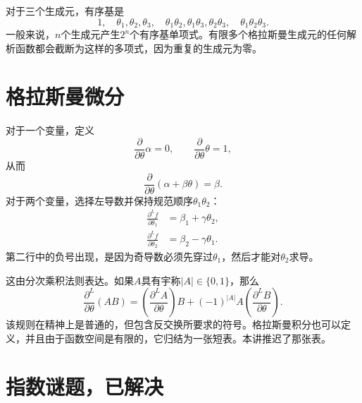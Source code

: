 \begin{classroomqa}
\end{classroomqa}

对于三个生成元，有序基是
\begin{equation}
1,\quad
\theta_1,\theta_2,\theta_3,\quad
\theta_1\theta_2,\theta_1\theta_3,\theta_2\theta_3,\quad
\theta_1\theta_2\theta_3.
\end{equation}
一般来说，\(n\)个生成元产生\(2^n\)个有序基单项式。有限多个格拉斯曼生成元的任何解析函数都会截断为这样的多项式，因为重复的生成元为零。

\section{格拉斯曼微分}

对于一个变量，定义
\begin{equation}
\frac{\partial}{\partial\theta}\alpha=0,
\qquad
\frac{\partial}{\partial\theta}\theta=1,
\end{equation}
从而
\begin{equation}
\frac{\partial}{\partial\theta}
(\alpha+\beta\theta)=\beta.
\end{equation}
对于两个变量，选择左导数并保持规范顺序\(\theta_1\theta_2\)：
\begin{align}
\frac{\partial^L f}{\partial\theta_1}
&=\beta_1+\gamma\theta_2,\\
\frac{\partial^L f}{\partial\theta_2}
&=\beta_2-\gamma\theta_1.
\end{align}
第二行中的负号出现，是因为奇导数必须先穿过\(\theta_1\)，然后才能对\(\theta_2\)求导。

这由分次乘积法则表达。如果\(A\)具有宇称\(|A|\in\{0,1\}\)，那么
\begin{equation}
\frac{\partial^L}{\partial\theta}(AB)
=\left(\frac{\partial^L A}{\partial\theta}\right)B
+(-1)^{|A|}A
\left(\frac{\partial^L B}{\partial\theta}\right).
\end{equation}
该规则在精神上是普通的，但包含反交换所要求的符号。格拉斯曼积分也可以定义，并且由于函数空间是有限的，它归结为一张短表。本讲推迟了那张表。

\section{指数谜题，已解决}

